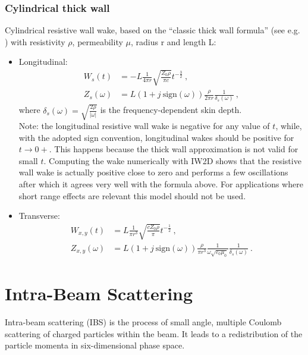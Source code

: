 \subsection*{Cylindrical thick wall}
Cylindrical resistive wall wake, based on the ``classic thick wall formula'' (see e.g. \cite[Chapter 2]{Chao:CollectiveInst}) with resistivity $\rho$, permeability $\mu$, radius r and length L:
\begin{itemize}
    \item Longitudinal:
    \begin{align}
        W_{s}(t) &= -L \frac{1}{4\pi r}
                    \sqrt{\frac{Z_0 \rho}{\pi c}}
                    t^{-\frac{3}{2}}~,\\
        Z_{s}(\omega) &= L \left(1 + j~\text{sign}(\omega) \right) \frac{\rho}{2\pi r} \frac{1}{\delta_s(\omega)}~,
    \end{align}
    where $\delta_s(\omega) = \sqrt{\frac{2 \rho}{|\omega|}}$ is the frequency-dependent skin depth.\\
    Note: the longitudinal resistive wall wake is negative for any value of $t$, while, with the adopted sign convention, longitudinal wakes should be positive for $t \rightarrow 0+$. This happens because the thick wall approximation is not valid for small $t$. Computing the wake numerically with IW2D shows that the resistive wall wake is actually positive close to zero and performs a few oscillations after which it agrees very well with the formula above. For applications where short range effects are relevant this model should not be used.
    \item Transverse:
    \begin{align}
        W_{x,y}(t) &= L \frac{1}{\pi r^3} \sqrt{\frac{c Z_0 \rho}{\pi}} t^{-\frac{1}{2}} ~,\\
        Z_{x,y}(\omega) &= L (1+j~\text{sign}(\omega))
                    \frac{\rho}{\pi r^3} \frac{1}{\omega \sqrt{\varepsilon_0 \mu_0}}
                    \frac{1}{\delta_s(\omega)}~.
    \end{align}    
\end{itemize}


\chapter{Intra-Beam Scattering}

Intra-beam scattering (IBS) is the process of small angle, multiple Coulomb scattering of charged particles within the beam.
It leads to a redistribution of the particle momenta in six-dimensional phase space.

